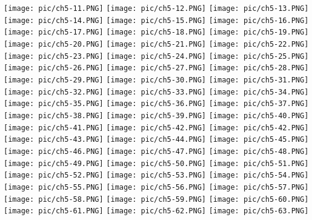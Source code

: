 \documentclass[UTF-8]{ctexart}
\begin{document}
\begin{center}
    \texttt{[image: pic/ch5-11.PNG]}
    \texttt{[image: pic/ch5-12.PNG]}
    \texttt{[image: pic/ch5-13.PNG]}
    \texttt{[image: pic/ch5-14.PNG]}
    \texttt{[image: pic/ch5-15.PNG]}
    \texttt{[image: pic/ch5-16.PNG]}
    \texttt{[image: pic/ch5-17.PNG]}
    \texttt{[image: pic/ch5-18.PNG]}
    \texttt{[image: pic/ch5-19.PNG]}
    \texttt{[image: pic/ch5-20.PNG]}
    \texttt{[image: pic/ch5-21.PNG]}
    \texttt{[image: pic/ch5-22.PNG]}
    \texttt{[image: pic/ch5-23.PNG]}
    \texttt{[image: pic/ch5-24.PNG]}
    \texttt{[image: pic/ch5-25.PNG]}
    \texttt{[image: pic/ch5-26.PNG]}
    \texttt{[image: pic/ch5-27.PNG]}
    \texttt{[image: pic/ch5-28.PNG]}
    \texttt{[image: pic/ch5-29.PNG]}
    \texttt{[image: pic/ch5-30.PNG]}
    \texttt{[image: pic/ch5-31.PNG]}
    \texttt{[image: pic/ch5-32.PNG]}
    \texttt{[image: pic/ch5-33.PNG]}
    \texttt{[image: pic/ch5-34.PNG]}
    \texttt{[image: pic/ch5-35.PNG]}
    \texttt{[image: pic/ch5-36.PNG]}
    \texttt{[image: pic/ch5-37.PNG]}
    \texttt{[image: pic/ch5-38.PNG]}
    \texttt{[image: pic/ch5-39.PNG]}
    \texttt{[image: pic/ch5-40.PNG]}
    \texttt{[image: pic/ch5-41.PNG]}
    \texttt{[image: pic/ch5-42.PNG]}
    \texttt{[image: pic/ch5-42.PNG]}
    \texttt{[image: pic/ch5-43.PNG]}
    \texttt{[image: pic/ch5-44.PNG]}
    \texttt{[image: pic/ch5-45.PNG]}
    \texttt{[image: pic/ch5-46.PNG]}
    \texttt{[image: pic/ch5-47.PNG]}
    \texttt{[image: pic/ch5-48.PNG]}
    \texttt{[image: pic/ch5-49.PNG]}
    \texttt{[image: pic/ch5-50.PNG]}
    \texttt{[image: pic/ch5-51.PNG]}
    \texttt{[image: pic/ch5-52.PNG]}
    \texttt{[image: pic/ch5-53.PNG]}
    \texttt{[image: pic/ch5-54.PNG]}
    \texttt{[image: pic/ch5-55.PNG]}
    \texttt{[image: pic/ch5-56.PNG]}
    \texttt{[image: pic/ch5-57.PNG]}
    \texttt{[image: pic/ch5-58.PNG]}
    \texttt{[image: pic/ch5-59.PNG]}
    \texttt{[image: pic/ch5-60.PNG]}
    \texttt{[image: pic/ch5-61.PNG]}
    \texttt{[image: pic/ch5-62.PNG]}
    \texttt{[image: pic/ch5-63.PNG]}

\end{center}
\end{document}
